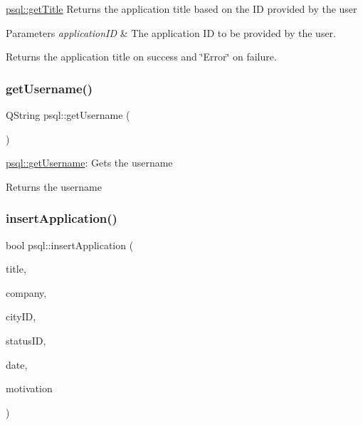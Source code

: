 \mbox{\hyperlink{classpsql_ada9e3be3e0866011edf53e30ec510afc}{psql\+::get\+Title}} Returns the application title based on the ID provided by the user 


\begin{DoxyParams}{Parameters}
{\em application\+ID} & The application ID to be provided by the user. \\
\hline
\end{DoxyParams}
\begin{DoxyReturn}{Returns}
the application title on success and \char`\"{}\+Error\char`\"{} on failure. 
\end{DoxyReturn}
\mbox{\label{classpsql_aecc9fd93dc5ca0c4f4a63d445a36d166}} 
\subsubsection{\texorpdfstring{get\+Username()}{getUsername()}}
{\footnotesize\ttfamily Q\+String psql\+::get\+Username (\begin{DoxyParamCaption}{ }\end{DoxyParamCaption})}



\mbox{\hyperlink{classpsql_aecc9fd93dc5ca0c4f4a63d445a36d166}{psql\+::get\+Username}}\+: Gets the username 

\begin{DoxyReturn}{Returns}
the username 
\end{DoxyReturn}
\mbox{\label{classpsql_a03f773904e698853caa0fcdb1f5b3809}} 
\subsubsection{\texorpdfstring{insert\+Application()}{insertApplication()}}
{\footnotesize\ttfamily bool psql\+::insert\+Application (\begin{DoxyParamCaption}\item[{Q\+String}]{title,  }\item[{Q\+String}]{company,  }\item[{int}]{city\+ID,  }\item[{int}]{status\+ID,  }\item[{Q\+String}]{date,  }\item[{Q\+String}]{motivation }\end{DoxyParamCaption})}



